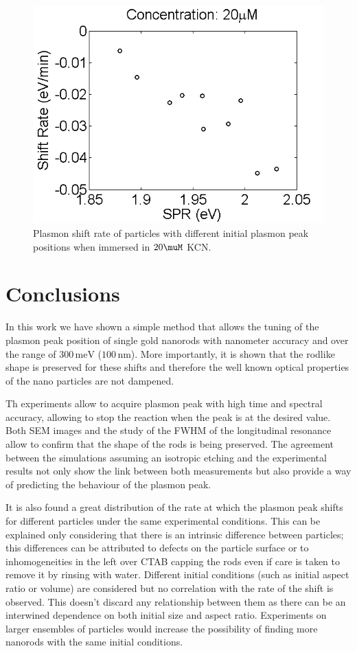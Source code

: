 \documentclass{article}
\begin{document}
\begin{figure}[p]
 \centering
 \includegraphics[width=0.95\linewidth]{shift_rate_vs_spr.png}
 \caption{Plasmon shift rate of particles with different initial plasmon peak
 positions when immersed in $20\muM$ KCN.}
 \label{fig:FWHM}
\end{figure}


\section{Conclusions}
In this work we have shown a simple method that allows the tuning of the plasmon
peak position of single gold nanorods with nanometer accuracy and over the range
of $300\,\textrm{meV}$ ($100\,\textrm{nm}$). More importantly, it is shown that
the rodlike shape is preserved for these shifts and therefore the well known
optical properties of the nano particles are not dampened. 

Th experiments allow to acquire plasmon peak with high time and spectral
accuracy, allowing to stop the reaction when the peak is at the desired value.
Both SEM images and the study of the FWHM of the longitudinal resonance allow to
confirm that the shape of the rods is being preserved. The agreement between the
simulations assuming an isotropic etching and the experimental results not only
show the link between both measurements but also provide a way of predicting the
behaviour of the plasmon peak. 

It is also found a great distribution of the rate at which the plasmon peak
shifts for different particles under the same experimental conditions. This can
be explained only considering that there is an intrinsic difference between
particles; this differences can be attributed to defects on the particle surface
or to inhomogeneities in the left over CTAB capping the rods even if care is
taken to remove it by rinsing with water. Different initial conditions (such as
initial aspect ratio or volume) are considered but no correlation with the rate
of the shift is observed. This doesn't discard any relationship between them as
there can be an interwined dependence on both initial size and aspect ratio.
Experiments on larger ensembles of particles would increase the possibility of
finding more nanorods with the same initial conditions. 
\end{document}
